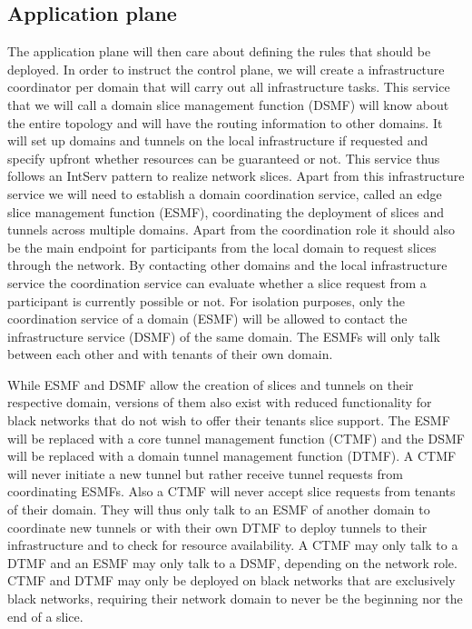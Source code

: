\subsection{Application plane}
The application plane will then care about defining the rules that should be deployed. In order to instruct the control plane, we will create a infrastructure coordinator per domain that will carry out all infrastructure tasks. This service that we will call a domain slice management function (DSMF) will know about the entire topology and will have the routing information to other domains. It will set up domains and tunnels on the local infrastructure if requested and specify upfront whether resources can be guaranteed or not. This service thus follows an IntServ pattern to realize network slices. Apart from this infrastructure service we will need to establish a domain coordination service, called an edge slice management function (ESMF), coordinating the deployment of slices and tunnels across multiple domains. Apart from the coordination role it should also be the main endpoint for participants from the local domain to request slices through the network. By contacting other domains and the local infrastructure service the coordination service can evaluate whether a slice request from a participant is currently possible or not. For isolation purposes, only the coordination service of a domain (ESMF) will be allowed to contact the infrastructure service (DSMF) of the same domain. The ESMFs will only talk between each other and with tenants of their own domain.

While ESMF and DSMF allow the creation of slices and tunnels on their respective domain, versions of them also exist with reduced functionality for black networks that do not wish to offer their tenants slice support. The ESMF will be replaced with a core tunnel management function (CTMF) and the DSMF will be replaced with a domain tunnel management function (DTMF). A CTMF will never initiate a new tunnel but rather receive tunnel requests from coordinating ESMFs. Also a CTMF will never accept slice requests from tenants of their domain. They will thus only talk to an ESMF of another domain to coordinate new tunnels or with their own DTMF to deploy tunnels to their infrastructure and to check for resource availability. A CTMF may only talk to a DTMF and an ESMF may only talk to a DSMF, depending on the network role. CTMF and DTMF may only be deployed on black networks that are exclusively black networks, requiring their network domain to never be the beginning nor the end of a slice.

